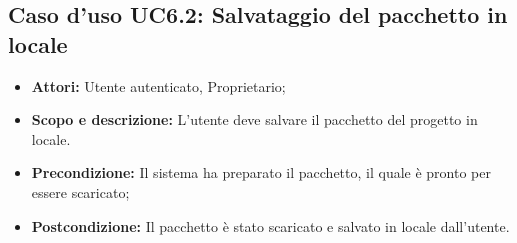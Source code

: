 \subsection{Caso d'uso UC6.2: Salvataggio del pacchetto in locale}
	\begin{itemize}
		\item \textbf{Attori:} Utente autenticato, Proprietario;
		\item \textbf{Scopo e descrizione:} L'utente deve salvare il pacchetto del progetto in locale.
		\item \textbf{Precondizione:} Il sistema ha preparato il pacchetto, il quale è pronto per essere scaricato;
		\item \textbf{Postcondizione:} Il pacchetto è stato scaricato e salvato in locale dall'utente.
	\end{itemize}

